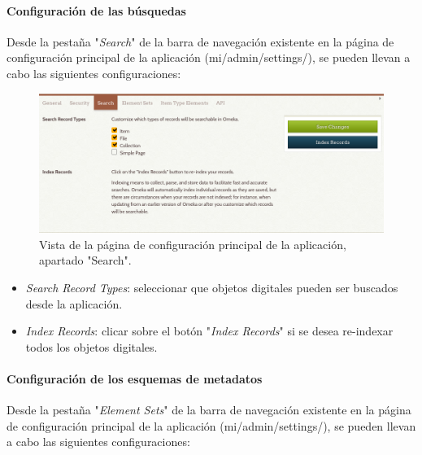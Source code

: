 \documentclass[
]{article}
\providecommand{\tightlist}{%
  \setlength{\itemsep}{0pt}\setlength{\parskip}{0pt}}
\begin{document}
\hypertarget{configuraciuxf3n-de-las-buxfasquedas}{%
\paragraph{Configuración de las
búsquedas}\label{configuraciuxf3n-de-las-buxfasquedas}}

Desde la pestaña "\emph{Search}" de la barra de navegación existente en
la página de configuración principal de la aplicación
({mi/admin/settings/}), se pueden llevan a cabo las siguientes
configuraciones:

\begin{figure}
\hypertarget{settings-search}{%
\centering
\includegraphics{../_static/images/settings-search.png}
\caption{Vista de la página de configuración principal de la aplicación,
apartado "Search".}\label{settings-search}
}
\end{figure}

\begin{itemize}
\tightlist
\item
  \emph{Search Record Types}: seleccionar que objetos digitales pueden
  ser buscados desde la aplicación.
\item
  \emph{Index Records}: clicar sobre el botón "\emph{Index Records}" si
  se desea re-indexar todos los objetos digitales.
\end{itemize}

\hypertarget{configuraciuxf3n-de-los-esquemas-de-metadatos}{%
\paragraph{Configuración de los esquemas de
metadatos}\label{configuraciuxf3n-de-los-esquemas-de-metadatos}}

Desde la pestaña "\emph{Element Sets}" de la barra de navegación
existente en la página de configuración principal de la aplicación
({mi/admin/settings/}), se pueden llevan a cabo las siguientes
configuraciones:
\end{document}
